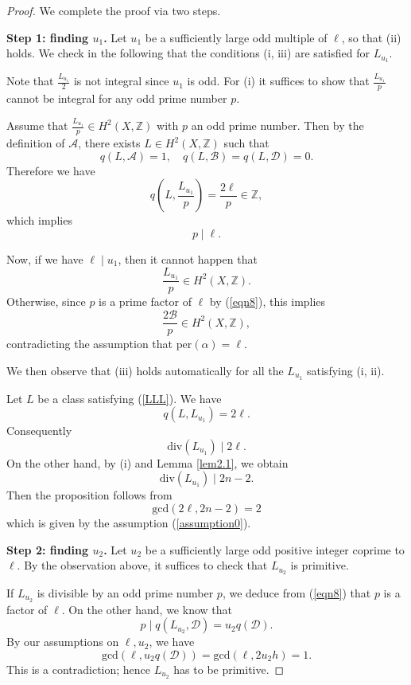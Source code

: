 \documentclass[10pt,a4paper]{amsart}
\newcommand{\BZ}{{\mathbb{Z}}}
\newcommand{\CA}{{\mathcal A}}
\newcommand{\CB}{{\mathcal B}}
\newcommand{\CD}{{\mathcal D}}
\begin{document}
\begin{proof}
We complete the proof via two steps.

\medskip
{\bf \noindent Step 1: finding $u_1$.}
Let $u_1$ be a sufficiently large odd multiple of $\ell$, so that (ii) holds. We check in the following that the conditions (i, iii) are satisfied for $L_{u_1}$.

Note that $\frac{L_{u_1}}{2}$ is not integral since $u_1$ is odd. For (i) it suffices to show that $\frac{L_{u_1}}{p}$ cannot be integral for any odd prime number $p$.

Assume that $\frac{L_{u_1}}{p} \in H^2(X, \BZ)$ with $p$ an odd prime number. Then by the definition of $\CA$, there exists $L \in H^2(X, \BZ)$ such that 
\begin{equation}\label{LLL}
q(L, \CA) =1, \quad q(L, \CB) =q(L, \CD)=0.
\end{equation}
Therefore we have
\[
q\left(L, \frac{L_{u_1}}{p}\right) = \frac{2\ell}{p} \in \BZ,
\]
which implies 
\begin{equation}\label{eqn8}
p \mid \ell.
\end{equation}    

Now, if we have $\ell \mid u_1$, then it cannot happen that
\[
\frac{L_{u_1}}{p} \in H^2(X, \BZ).
\]
Otherwise, since $p$ is a prime factor of $\ell$ by (\ref{eqn8}), this implies 
\[
\frac{2\CB}{p} \in H^2(X,\BZ),
\]
contradicting the assumption that $\mathrm{per}(\alpha) = \ell$. 


We then observe that (iii) holds automatically for all the $L_{u_1}$ satisfying (i, ii).

Let $L$ be a class satisfying (\ref{LLL}). We have
\[
q(L, L_{u_1}) = 2\ell.
\]
Consequently 
\[
\mathrm{div}(L_{u_1}) \mid 2\ell.
\]
On the other hand, by (i) and Lemma \ref{lem2.1}, we obtain
\[
\mathrm{div}(L_{u_1}) \mid 2n-2.
\]
Then the proposition follows from 
\[
\mathrm{gcd}(2\ell, 2n-2) = 2
\]
which is given by the assumption (\ref{assumption0}).

\medskip
{\bf \noindent Step 2: finding $u_2$.}
Let $u_2$ be a sufficiently large odd positive integer coprime to $\ell$. By the observation above, it suffices to check that $L_{u_2}$ is primitive. 


If $L_{u_2}$ is divisible by an odd prime number $p$, we deduce from (\ref{eqn8}) that $p$ is a factor of $\ell$. On the other hand, we know that 
\[
p \mid q(L_{u_2}, \CD) = u_2q(\CD).
\]
By our assumptions on $\ell, u_2$, we have 
\[
\mathrm{gcd}(\ell, u_2q(\CD)) =\mathrm{gcd}(\ell, 2u_2h) = 1.
\]
This is a contradiction; hence $L_{u_2}$ has to be primitive.
\end{proof}
\end{document}
